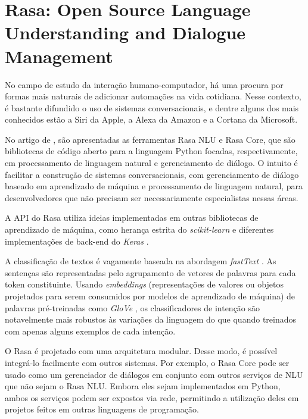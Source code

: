 \section{Rasa: Open Source Language Understanding and Dialogue Management \cite{bocklisch2017}}
\label{sec:bocklisch2017}

No campo de estudo da interação humano-computador, há uma procura por formas mais naturais de adicionar automações na vida cotidiana. Nesse contexto, é bastante difundido o uso de sistemas conversacionais, e dentre alguns dos mais conhecidos estão a Siri da Apple, a Alexa da Amazon e a Cortana da Microsoft.

No artigo de , são apresentadas as ferramentas Rasa NLU e Rasa Core, que são bibliotecas de código aberto para a linguagem Python focadas, respectivamente, em processamento de linguagem natural e gerenciamento de diálogo. O intuito é facilitar a construção de sistemas conversacionais, com gerenciamento de diálogo baseado em aprendizado de máquina e processamento de linguagem natural, para desenvolvedores que não precisam ser necessariamente especialistas nessas áreas.

A API do Rasa utiliza ideias implementadas em outras bibliotecas de aprendizado de máquina, como herança estrita do \textit{scikit-learn}  e diferentes implementações de back-end do \textit{Keras} .

A classificação de textos é vagamente baseada na abordagem \textit{fastText} . As sentenças são representadas pelo agrupamento de vetores de palavras para cada token constituinte. Usando \textit{embeddings} (representações de valores ou objetos projetados para serem consumidos por modelos de aprendizado de máquina) de palavras pré-treinadas como \textit{GloVe} , os classificadores de intenção são notavelmente mais robustos às variações da linguagem do que quando treinados com apenas alguns exemplos de cada intenção.

O Rasa é projetado com uma arquitetura modular. Desse modo, é possível integrá-lo facilmente com outros sistemas. Por exemplo, o Rasa Core pode ser usado como um gerenciador de diálogos em conjunto com outros serviços de NLU que não sejam o Rasa NLU. Embora eles sejam implementados em Python, ambos os serviços podem ser expostos via rede, permitindo a utilização deles em projetos feitos em outras linguagens de programação.


